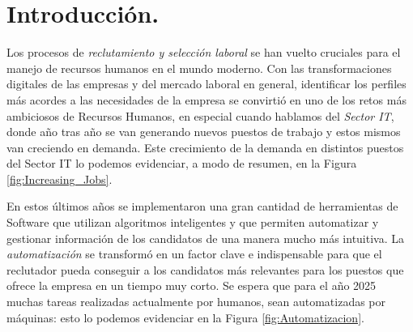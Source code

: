 \documentclass[12pt,a4paper]{article}
\begin{document}
\begin{sloppypar}
\cleardoublepage    %

\tableofcontents 	%

\cleardoublepage    %

\section{Introducción.}\label{Intro}
Los procesos de \textit{reclutamiento y selección laboral} se han vuelto cruciales para el manejo de recursos humanos en el mundo moderno. Con las transformaciones digitales de las empresas y del mercado laboral en general, identificar los perfiles más acordes a las necesidades de la empresa se convirtió en uno de los retos más ambiciosos de Recursos Humanos, en especial cuando hablamos del \textit{Sector IT}, donde año tras año se van generando nuevos puestos de trabajo y estos mismos van creciendo en demanda. Este crecimiento de la demanda en distintos puestos del Sector IT lo podemos evidenciar, a modo de resumen, en la Figura \ref{fig:Increasing_Jobs}.

En estos últimos años se implementaron una gran cantidad de herramientas de Software que utilizan algoritmos inteligentes y que permiten automatizar y gestionar información de los candidatos de una manera mucho más intuitiva\cite{trabajos_relacionados_1,trabajos_relacionados_2,trabajos_relacionados_3,trabajos_relacionados_4,
trabajos_relacionados_5,trabajos_relacionados_6,trabajos_relacionados_7,trabajos_relacionados_8,
trabajos_relacionados_9,trabajos_relacionados_10, trabajos_relacionados_11, trabajos_relacionados_12, trabajos_relacionados_13, trabajos_relacionados_14, trabajos_relacionados_15}. La \textit{automatización} se transformó en un factor clave e indispensable para que el reclutador pueda conseguir a los candidatos más relevantes para los puestos que ofrece la empresa en un tiempo muy corto.
Se espera que para el año 2025 muchas tareas realizadas actualmente por humanos, sean automatizadas por máquinas: esto lo podemos evidenciar en la Figura \ref{fig:Automatizacion}.


\end{sloppypar}
\end{document}
